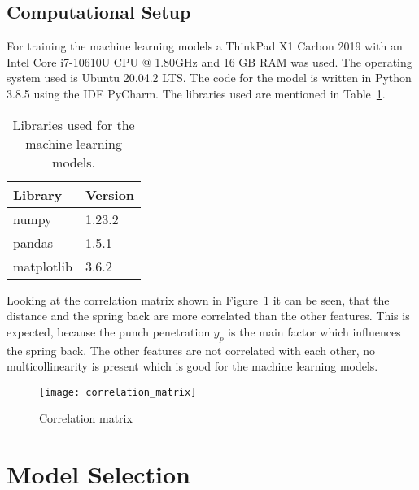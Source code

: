 
\subsection{Computational Setup}
For training the machine learning models a ThinkPad X1 Carbon 2019 with an Intel Core i7-10610U CPU @ 1.80GHz and 16 GB RAM was used. The operating system used is Ubuntu 20.04.2 LTS. The code for the model is written in Python 3.8.5 using the IDE PyCharm. The libraries used are mentioned in Table~\ref{table:libraries}.

\captionsetup{width=1\textwidth}

\begin{table}[H]
    \centering
    \begin{tabular}{|ll|}
        \hline
        \textbf{Library} & \textbf{Version} \\
        \hline
        numpy            & 1.23.2           \\
        pandas           & 1.5.1            \\
        matplotlib       & 3.6.2            \\ \hline
    \end{tabular}
    \caption{Libraries used for the machine learning models.}
    \label{table:libraries}
\end{table}

Looking at the correlation matrix shown in Figure~\ref*{fig:correlation_matrix} it can be seen, that the distance and the spring back are more correlated than the other features. This is expected, because the punch penetration $y_p$ is the main factor which influences the spring back. The other features are not correlated with each other, no multicollinearity is present which is good for the machine learning models.

\begin{figure}[H]
    \centering
    \texttt{[image: correlation\_matrix]}
    \caption{Correlation matrix}
    \label{fig:correlation_matrix}
\end{figure}

\section{Model Selection}
